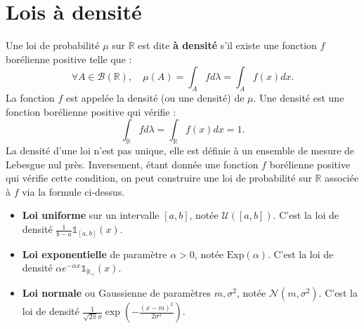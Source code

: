 \section{Lois à densité}
\begin{definition}
Une loi de probabilité $\mu$ sur $\mathbb{R}$ est dite \textbf{à densité} s'il existe une fonction $f$ borélienne positive telle que :
\[
\forall A \in \mathcal{B}(\mathbb{R}), \quad \mu(A) = \int_A f d\lambda = \int_A f(x) dx.
\]
La fonction $f$ est appelée la densité (ou une densité) de $\mu$. Une densité est une fonction borélienne positive qui vérifie :
\[
\int_{\mathbb{R}} f d\lambda = \int_{\mathbb{R}} f(x) dx = 1.
\]
La densité d'une loi n'est pas unique, elle est définie à un ensemble de mesure de Lebesgue nul près. Inversement, étant donnée une fonction $f$ borélienne positive qui vérifie cette condition, on peut construire une loi de probabilité sur $\mathbb{R}$ associée à $f$ via la formule ci-dessus.
\end{definition}
\begin{example}
\begin{itemize}
    \item \textbf{Loi uniforme} sur un intervalle $[a,b]$, notée $\mathcal{U}([a,b])$. C'est la loi de densité $\frac{1}{b-a}\mathbb{1}_{[a,b]}(x)$.
    \item \textbf{Loi exponentielle} de paramètre $\alpha > 0$, notée $\text{Exp}(\alpha)$. C'est la loi de densité $\alpha e^{-\alpha x} \mathbb{1}_{\mathbb{R}_+}(x)$.
    \item \textbf{Loi normale} ou Gaussienne de paramètres $m, \sigma^2$, notée $\mathcal{N}(m, \sigma^2)$. C'est la loi de densité $\frac{1}{\sqrt{2\pi}\sigma} \exp\left(-\frac{(x-m)^2}{2\sigma^2}\right)$.
\end{itemize}
\end{example}
